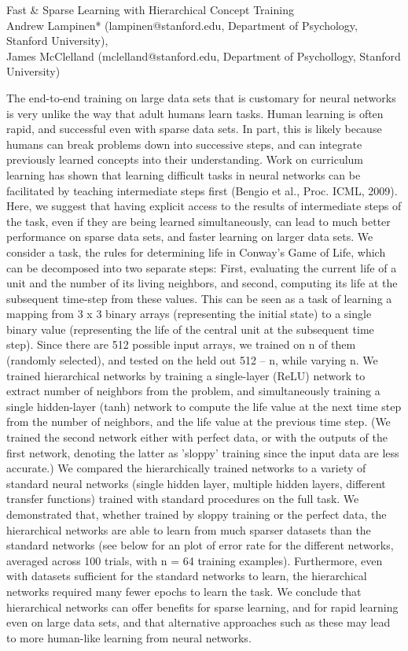 \documentclass[10pt]{article}
\begin{document}
\begingroup  
  \centering
  \large Fast \& Sparse Learning with Hierarchical Concept Training\\[1.5em]
  \small{Andrew Lampinen* (lampinen@stanford.edu, Department of Psychology, Stanford University),\\ James McClelland (mclelland@stanford.edu, Department of Psychollogy, Stanford University)}\par
\endgroup
\vspace{10pt}
\noindent
The end-to-end training on large data sets that is customary for neural networks is very unlike the way that adult humans learn tasks. Human learning is often rapid, and successful even with sparse data sets. In part, this is likely because humans can break problems down into successive steps, and can integrate previously learned concepts into their understanding. Work on curriculum learning has shown that learning difficult tasks in neural networks can be facilitated by teaching intermediate steps first (Bengio et al., Proc. ICML, 2009). Here, we suggest that having explicit access to the results of intermediate steps of the task, even if they are being learned simultaneously, can lead to much better performance on sparse data sets, and faster learning on larger data sets. We consider a task, the rules for determining life in Conway's Game of Life, which can be decomposed into two separate steps: First, evaluating the current life of a unit and the number of its living neighbors, and second, computing its life at the subsequent time-step from these values. This can be seen as a task of learning a mapping from 3 x 3 binary arrays (representing the initial state) to a single binary value (representing the life of the central unit at the subsequent time step). Since there are 512 possible input arrays, we trained on n of them (randomly selected), and tested on the held out 512 – n, while varying n. We trained hierarchical networks by training a single-layer (ReLU) network to extract number of neighbors from the problem, and simultaneously training a single hidden-layer (tanh) network to compute the life value at the next time step from the number of neighbors, and the life value at the previous time step. (We trained the second network either with perfect data, or with the outputs of the first network, denoting the latter as 'sloppy' training since the input data are less accurate.) We compared the hierarchically trained networks to a variety of standard neural networks (single hidden layer, multiple hidden layers, different transfer functions) trained with standard procedures on the full task. We demonstrated that, whether trained by sloppy training or the perfect data, the hierarchical networks are able to learn from much sparser datasets than the standard networks (see below for an plot of error rate for the different networks, averaged across 100 trials, with n = 64 training examples). Furthermore, even with datasets sufficient for the standard networks to learn, the hierarchical networks required many fewer epochs to learn the task. We conclude that hierarchical networks can offer benefits for sparse learning, and for rapid learning even on large data sets, and that alternative approaches such as these may lead to more human-like learning from neural networks.
\end{document}
